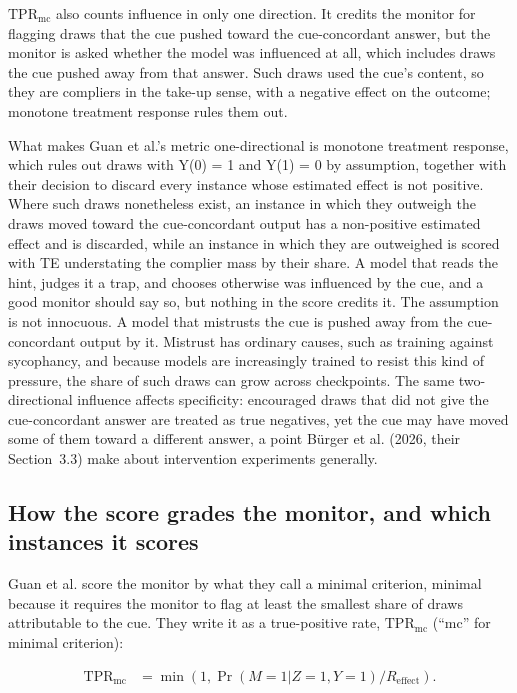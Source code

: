 \documentclass[11pt]{article}
\begin{document}
$\mathrm{TPR}_{\mathrm{mc}}$ also counts influence in only one direction. It credits the monitor for flagging draws that the cue pushed toward the cue-concordant answer, but the monitor is asked whether the model was influenced at all, which includes draws the cue pushed away from that answer. Such draws used the cue’s content, so they are compliers in the take-up sense, with a negative effect on the outcome; monotone treatment response rules them out.

What makes Guan et al.’s metric one-directional is monotone treatment response, which rules out draws with Y(0) = 1 and Y(1) = 0 by assumption, together with their decision to discard every instance whose estimated effect is not positive. Where such draws nonetheless exist, an instance in which they outweigh the draws moved toward the cue-concordant output has a non-positive estimated effect and is discarded, while an instance in which they are outweighed is scored with TE understating the complier mass by their share. A model that reads the hint, judges it a trap, and chooses otherwise was influenced by the cue, and a good monitor should say so, but nothing in the score credits it. The assumption is not innocuous. A model that mistrusts the cue is pushed away from the cue-concordant output by it. Mistrust has ordinary causes, such as training against sycophancy, and because models are increasingly trained to resist this kind of pressure, the share of such draws can grow across checkpoints. The same two-directional influence affects specificity: encouraged draws that did not give the cue-concordant answer are treated as true negatives, yet the cue may have moved some of them toward a different answer, a point Bürger et al. (2026, their Section~3.3) make about intervention experiments generally.

\subsection{How the score grades the monitor, and which instances it scores}
Guan et al. score the monitor by what they call a minimal criterion, minimal because it requires the monitor to flag at least the smallest share of draws attributable to the cue. They write it as a true-positive rate, $\mathrm{TPR}_{\mathrm{mc}}$ (“mc” for minimal criterion):

\begin{align*}
  \mathrm{TPR}_{\mathrm{mc}} &= \min(1, \Pr(M = 1 | Z = 1, Y = 1) / R_{\mathrm{effect}}).
\end{align*}
\end{document}

